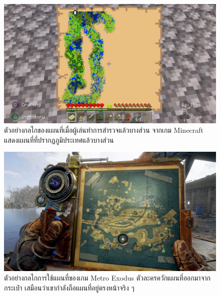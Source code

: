 \begin{figure}[h]
  \begin{center}
  \includegraphics[width=\textwidth]{./img/minecraftmap-partial.png}
  \end{center}
  \caption[ตัวอย่างกลไกของแผนที่เมื่อผู้เล่นทำการสำรวจแล้วบางส่วน จากเกม Minecraft]{ตัวอย่างกลไกของแผนที่เมื่อผู้เล่นทำการสำรวจแล้วบางส่วน จากเกม Minecraft แสดงแผนที่ที่ปรากฏภูมิประเทศแล้วบางส่วน}
  \label{fig:minecrafmap-partial}
\end{figure}

\begin{figure}[h]
  \begin{center}
  \includegraphics[width=\textwidth]{./img/metromap.jpg}
  \end{center}
  \caption[ตัวอย่างกลไกการใช้แผนที่ของเกม Metro Exodus]{ตัวอย่างกลไกการใช้แผนที่ของเกม Metro Exodus ตัวละครควักแผนที่ออกมาจากกระเป๋า เสมือนว่าเขากำลังถือแผนที่อยู่ตรงหน้าจริง ๆ}
  \label{fig:metromap}
\end{figure}
